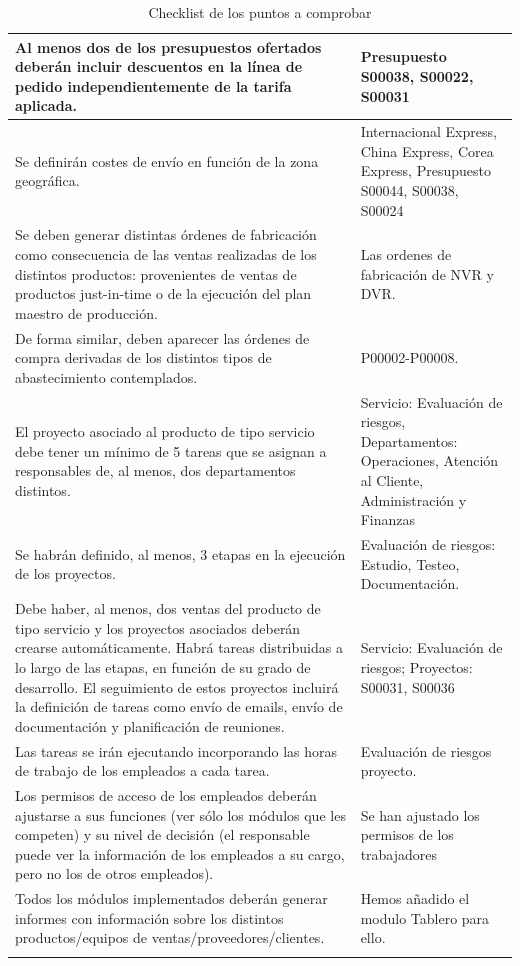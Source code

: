 \documentclass{report}
\begin{document}
\begin{longtable}{|p{7cm}|p{7cm}|}
          \hline
          Al menos dos de los presupuestos ofertados deberán incluir descuentos en la línea de pedido independientemente de la tarifa aplicada. & Presupuesto S00038, S00022, S00031 \\ 
          \hline
          Se definirán costes de envío en función de la zona geográfica. & Internacional Express, China Express, Corea Express, Presupuesto S00044, S00038, S00024\\
          \hline
          Se deben generar distintas órdenes de fabricación como consecuencia de las ventas realizadas de los distintos productos: provenientes de ventas de productos just-in-time o de la ejecución del plan maestro de producción. & Las ordenes de fabricación de NVR y DVR.\\
          \hline
          De forma similar, deben aparecer las órdenes de compra derivadas de los distintos tipos de abastecimiento contemplados. & P00002-P00008. \\
          \hline
          El proyecto asociado al producto de tipo servicio debe tener un mínimo de 5 tareas que se asignan a responsables de, al menos, dos departamentos distintos. & Servicio: Evaluación de riesgos, Departamentos: Operaciones, Atención al Cliente, Administración y Finanzas \\
          \hline
          Se habrán definido, al menos, 3 etapas en la ejecución de los proyectos. & Evaluación de riesgos: Estudio, Testeo, Documentación. \\
          \hline
          Debe haber, al menos, dos ventas del producto de tipo servicio y los proyectos asociados deberán crearse automáticamente. Habrá tareas distribuidas a lo largo de las etapas, en función de su grado de desarrollo. El seguimiento de estos proyectos incluirá la definición de tareas como envío de emails, envío de documentación y planificación de reuniones. & Servicio: Evaluación de riesgos; Proyectos: S00031, S00036 \\
          \hline
          Las tareas se irán ejecutando incorporando las horas de trabajo de los empleados a cada tarea. & Evaluación de riesgos proyecto. \\
          \hline
          Los permisos de acceso de los empleados deberán ajustarse a sus funciones (ver sólo los módulos que les competen) y su nivel de decisión (el responsable puede ver la información de los empleados a su cargo, pero no los de otros empleados). & Se han ajustado los permisos de los trabajadores\\
          \hline
          Todos los módulos implementados deberán generar informes con información sobre los distintos productos/equipos de ventas/proveedores/clientes. & Hemos añadido el modulo Tablero para ello. \\
          \hline
          \caption{Checklist de los puntos a comprobar}
        \end{longtable}
\end{document}
